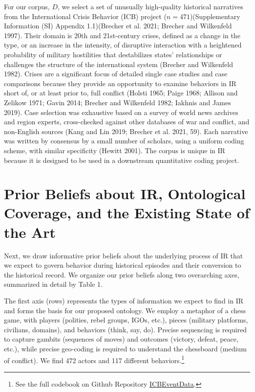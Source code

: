 \documentclass{article}
\begin{document}
For our corpus, \(D\), we select a set of unusually high-quality
historical narratives from the International Crisis Behavior (ICB)
project (\(n=471\))(Supplementary Information (SI) Appendix 1.1)(Brecher
et al. 2021; Brecher and Wilkenfeld 1997). Their domain is 20th and
21st-century crises, defined as a change in the type, or an increase in
the intensity, of disruptive interaction with a heightened probability
of military hostilities that destabilizes states' relationships or
challenges the structure of the international system (Brecher and
Wilkenfeld 1982). Crises are a significant focus of detailed single case
studies and case comparisons because they provide an opportunity to
examine behaviors in IR short of, or at least prior to, full conflict
(Holsti 1965; Paige 1968; Allison and Zelikow 1971; Gavin 2014; Brecher
and Wilkenfeld 1982; Iakhnis and James 2019). Case selection was
exhaustive based on a survey of world news archives and region experts,
cross-checked against other databases of war and conflict, and
non-English sources (Kang and Lin 2019; Brecher et al. 2021, 59). Each
narrative was written by consensus by a small number of scholars, using
a uniform coding scheme, with similar specificity (Hewitt 2001). The
corpus is unique in IR because it is designed to be used in a downstream
quantitative coding project.

\hypertarget{prior-beliefs-about-ir-ontological-coverage-and-the-existing-state-of-the-art}{%
\section{Prior Beliefs about IR, Ontological Coverage, and the Existing
State of the
Art}\label{prior-beliefs-about-ir-ontological-coverage-and-the-existing-state-of-the-art}}

Next, we draw informative prior beliefs about the underlying process of
IR that we expect to govern behavior during historical episodes and
their conversion to the historical record. We organize our prior beliefs
along two overarching axes, summarized in detail by Table 1.

The first axis (rows) represents the types of information we expect to
find in IR and forms the basis for our proposed ontology. We employ a
metaphor of a chess game, with players (polities, rebel groups, IGOs,
etc.), pieces (military platforms, civilians, domains), and behaviors
(think, say, do). Precise sequencing is required to capture gambits
(sequences of moves) and outcomes (victory, defeat, peace, etc.), while
precise geo-coding is required to understand the chessboard (medium of
conflict). We find 472 actors and 117 different behaviors.\footnote{See
  the full codebook on Github Repository
  \href{https://urldefense.com/v3/__https://github.com/CenterForPeaceAndSecurityStudies/ICBEventData__;!!Mih3wA!WxDJtEczKfxGTh0S2Krunap8ReymFEL5iTWaSfOHeqlSdyfRx77zmjBSWO1OAm13$}{ICBEventData}.}
\end{document}
